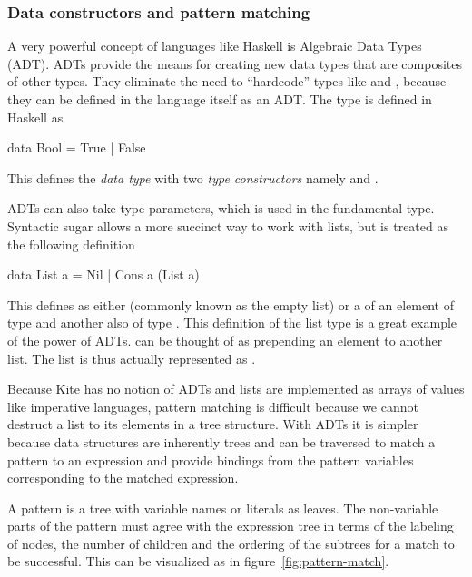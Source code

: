 \subsubsection{Data constructors and pattern matching}
A very powerful concept of languages like Haskell is Algebraic Data Types (ADT). ADTs provide the means for creating new data types that are composites of other types. They eliminate the need to ``hardcode'' types like  and , because they can be defined in the language itself as an ADT. The  type is defined in Haskell as

\begin{haskell}
data Bool = True | False
\end{haskell}

This defines the \emph{data type}  with two \emph{type constructors} namely  and .

ADTs can also take type parameters, which is used in the fundamental  type. Syntactic sugar allows a more succinct way to work with lists, but is treated as the following definition

\begin{haskell}
data List a = Nil | Cons a (List a)
\end{haskell}

This defines  as either  (commonly known as the empty list) or a  of an element of type  and another  also of type . This definition of the list type is a great example of the power of ADTs.  can be thought of as prepending an element to another list. The list \code{[1, 2, 3]} is thus actually represented as .

Because Kite has no notion of ADTs and lists are implemented as arrays of values like imperative languages, pattern matching is difficult because we cannot destruct a list to its elements in a tree structure. With ADTs it is simpler because data structures are inherently trees and can be traversed to match a pattern to an expression and provide bindings from the pattern variables corresponding to the matched expression.

A pattern is a tree with variable names or literals as leaves. The non-variable parts of the pattern must agree with the expression tree in terms of the labeling of nodes, the number of children and the ordering of the subtrees\cite[p. 514]{wilhelm95} for a match to be successful. This can be visualized as in figure~\ref{fig:pattern-match}.

